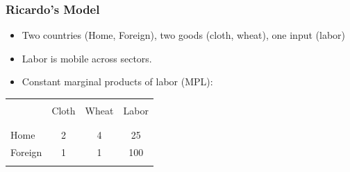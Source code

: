 \documentclass[handout]{beamer}
\begin{document}
\begin{frame}[t]
\frametitle{Ricardo's Model}
\bigskip
\begin{itemize}
\item Two countries (Home, Foreign), two goods (cloth, wheat), one input (labor)
\bigskip
\item Labor is mobile across sectors.
\bigskip
\item Constant marginal products of labor (MPL):
\end{itemize}
\bigskip
\begin{table}[t]
\begin{center}
\begin{tabular}{lccc}%
\vspace{-0.6cm}\\
\hline%
\hline
\vspace{-.4cm}       &\multicolumn{3}{c}{}\\
                     & Cloth  & Wheat  &  Labor \\%
\vspace{-.4cm}       &\multicolumn{3}{c}{}\\
\hline%
\vspace{-.4cm}       &\multicolumn{3}{c}{}\\
Home                 &   2    &   4     &   25  \\
Foreign              &    1    &    1     &   100  \\
\vspace{-.4cm}       &\multicolumn{3}{c}{}\\
\hline
\end{tabular}
\end{center}
\end{table}
\end{frame}

\end{document}

